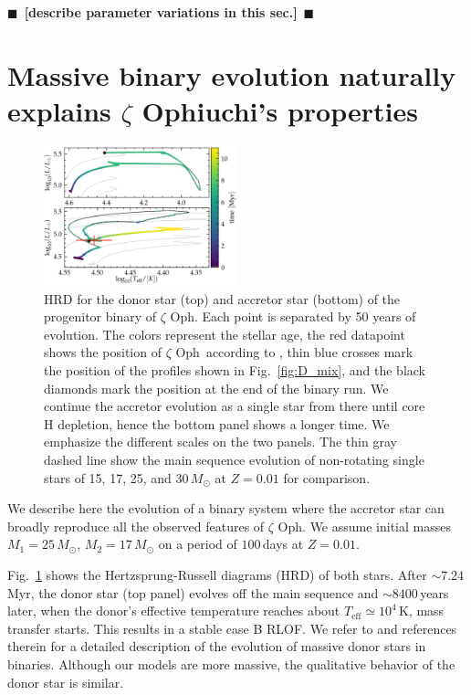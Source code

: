 \documentclass[twocolumn,twocolappendix,trackchanges]{aastex63}
\DeclareRobustCommand{\Figref}[1]{Fig.~\ref{#1}}
\newcommand{\zoph}{$\zeta$ Oph}
\newcommand{\todo}[1]{{\large $\blacksquare$~\textbf{\color{red}[#1]}}~$\blacksquare$}
\begin{document}
\todo{describe parameter variations in this sec.}

\section{Massive binary evolution naturally explains $\zeta$
  Ophiuchi's properties}
\label{sec:best_model}

\begin{figure}[tbp]
  \includegraphics[width=0.5\textwidth]{HRD_both}
  \caption{HRD for the donor star (top) and accretor star (bottom) of
    the progenitor binary of \zoph. Each point is separated by 50
    years of evolution. The colors represent the
    stellar age, the red datapoint shows the position of \zoph\
    according to \cite{villamariz:05}, thin blue crosses mark the
    position of the profiles shown in \Figref{fig:D_mix}, and the black diamonds mark the
    position at the end of the binary run. We continue the accretor
    evolution as a single star from there until core H depletion,
    hence the bottom panel shows a longer time. We emphasize the different
    scales on the two panels. The thin gray dashed line show the main
    sequence evolution of non-rotating single stars of 15, 17, 25, and
    30\,$M_\odot$ at $Z=0.01$ for comparison.}
  \label{fig:HRD_both}
\end{figure}


We describe here the evolution of a binary system where the accretor
star can broadly reproduce all the observed features of \zoph. We assume initial masses
$M_1=25\,M_\odot$, $M_2=17\,M_\odot$ on a period of $100$\,days at
$Z=0.01$.

\Figref{fig:HRD_both} shows the Hertzsprung-Russell diagrams (HRD)
of both stars. After $\sim$$7.24$\,Myr, the donor star (top panel) evolves off the main
sequence and $\sim8400$\,years later, when the donor's effective
temperature reaches about $T_\mathrm{eff}\simeq 10^4$\,K, mass transfer starts. This
results in a stable case B RLOF. We refer to \cite{gotberg:17, laplace:21, blagorodnova:21}
and references therein for a detailed description of the evolution of
massive donor stars in binaries. Although our models are
more massive, the qualitative behavior of the donor star is similar.
\end{document}
